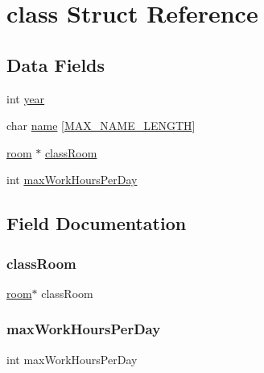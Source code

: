 \hypertarget{structclass}{}\section{class Struct Reference}
\label{structclass}
\subsection*{Data Fields}
\begin{DoxyCompactItemize}
\item 
int \hyperlink{structclass_abeac221e38b7b9ce7df8722c842bf671}{year}
\item 
char \hyperlink{structclass_ad50982abf9e9bbbc784f8f17fa25b1b2}{name} \mbox{[}\hyperlink{main_8c_a0c397a708cec89c74029582574516b30}{M\+A\+X\+\_\+\+N\+A\+M\+E\+\_\+\+L\+E\+N\+G\+TH}\mbox{]}
\item 
\hyperlink{structroom}{room} $\ast$ \hyperlink{structclass_a52c2ba4ef4837566d565a81cdf3fd530}{class\+Room}
\item 
int \hyperlink{structclass_a1ffb8e5412af16a5be765756fe880507}{max\+Work\+Hours\+Per\+Day}
\end{DoxyCompactItemize}


\subsection{Field Documentation}
\hypertarget{structclass_a52c2ba4ef4837566d565a81cdf3fd530}{}\label{structclass_a52c2ba4ef4837566d565a81cdf3fd530} 
\subsubsection{\texorpdfstring{class\+Room}{classRoom}}
{\footnotesize\ttfamily \hyperlink{structroom}{room}$\ast$ class\+Room}

\hypertarget{structclass_a1ffb8e5412af16a5be765756fe880507}{}\label{structclass_a1ffb8e5412af16a5be765756fe880507} 
\subsubsection{\texorpdfstring{max\+Work\+Hours\+Per\+Day}{maxWorkHoursPerDay}}
{\footnotesize\ttfamily int max\+Work\+Hours\+Per\+Day}

